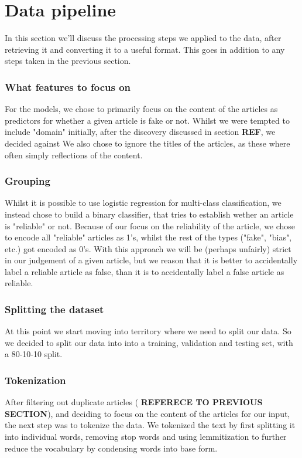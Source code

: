 \section{Data pipeline}
In this section we'll discuss the processing steps we applied to the data, after retrieving it and converting it to a
useful format. This goes in addition to any steps taken in the previous section. 

\subsubsection{What features to focus on}
For the models, we chose to primarily focus on the content of the articles as predictors for whether a given article is
fake or not. Whilst we were tempted to include "domain" initially, after the discovery discussed in section \textbf{REF},
we decided against We also chose to ignore the titles of the articles, as these where often simply reflections of the
content. 

\subsubsection{Grouping}
Whilst it is possible to use logistic regression for multi-class classification, we instead chose to build a binary
classifier, that tries to establish wether an article is "reliable" or not. Because of our focus on the reliability of
the article, we chose to encode all "reliable" articles as 1's, whilst the rest of the types ("fake", "bias", etc.) got
encoded as 0's. With this approach we will be (perhaps unfairly) strict in our judgement of a given article, but we
reason that it is better to accidentally label a reliable article as false, than it is to accidentally label a false
article as reliable. 

\subsubsection{Splitting the dataset}
At this point we start moving into territory where we need to split our data. So we decided to split our data into into
a training, validation and testing set, with a 80-10-10 split.

\subsubsection{Tokenization}
After filtering out duplicate articles ( \textbf{REFERECE TO PREVIOUS SECTION}), and deciding to focus on the content of
the articles for our input, the next step was to tokenize the data. We tokenized the text by first splitting it into
individual words, removing stop words and using lemmitization to further reduce the vocabulary by condensing words into
base form.

